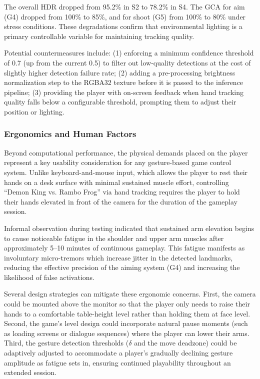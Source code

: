 \documentclass[journal,onecolumn,12pt,draftclsnofoot]{IEEEtran}
\begin{document}
\begin{itemize}
The overall HDR dropped from 95.2\% in S2 to 78.2\% in S4. The GCA for aim (G4) dropped from 100\% to 85\%, and for shoot (G5) from 100\% to 80\% under stress conditions. These degradations confirm that environmental lighting is a primary controllable variable for maintaining tracking quality.

Potential countermeasures include: (1) enforcing a minimum confidence threshold of 0.7 (up from the current 0.5) to filter out low-quality detections at the cost of slightly higher detection failure rate; (2) adding a pre-processing brightness normalization step to the RGBA32 texture before it is passed to the inference pipeline; (3) providing the player with on-screen feedback when hand tracking quality falls below a configurable threshold, prompting them to adjust their position or lighting.

\subsubsection{Ergonomics and Human Factors}
Beyond computational performance, the physical demands placed on the player represent a key usability consideration for any gesture-based game control system. Unlike keyboard-and-mouse input, which allows the player to rest their hands on a desk surface with minimal sustained muscle effort, controlling ``Demon King vs. Rambo Frog'' via hand tracking requires the player to hold their hands elevated in front of the camera for the duration of the gameplay session.

Informal observation during testing indicated that sustained arm elevation begins to cause noticeable fatigue in the shoulder and upper arm muscles after approximately 5--10 minutes of continuous gameplay. This fatigue manifests as involuntary micro-tremors which increase jitter in the detected landmarks, reducing the effective precision of the aiming system (G4) and increasing the likelihood of false activations.

Several design strategies can mitigate these ergonomic concerns. First, the camera could be mounted above the monitor so that the player only needs to raise their hands to a comfortable table-height level rather than holding them at face level. Second, the game's level design could incorporate natural pause moments (such as loading screens or dialogue sequences) where the player can lower their arms. Third, the gesture detection thresholds ($\delta$ and the move deadzone) could be adaptively adjusted to accommodate a player's gradually declining gesture amplitude as fatigue sets in, ensuring continued playability throughout an extended session.


\end{itemize}
\end{document}
